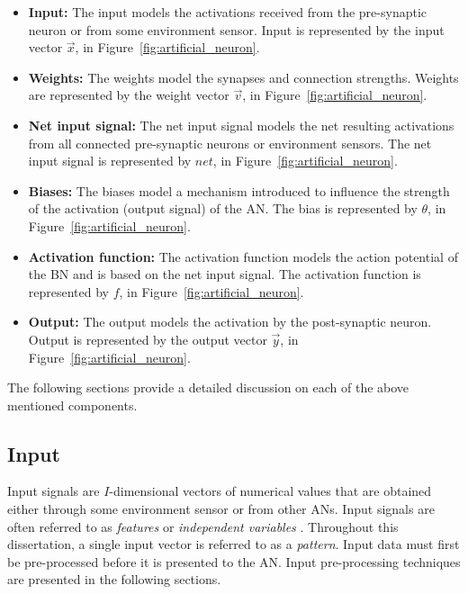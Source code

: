 \begin{itemize}
    \item \textbf{Input:} The input models the activations received from the pre-synaptic neuron or from some environment sensor. Input is represented by the input vector $\vec{x}$, in Figure~\ref{fig:artificial_neuron}.

    \item \textbf{Weights:} The weights model the synapses and connection strengths. Weights are represented by the weight vector $\vec{v}$, in Figure~\ref{fig:artificial_neuron}.

    \item {}\textbf{Net input signal:} The net input signal models the net resulting activations from all connected pre-synaptic neurons or environment sensors. The net input signal is represented by $net$, in Figure~\ref{fig:artificial_neuron}.

    \item \textbf{Biases:} The biases model a mechanism introduced to influence the strength of the activation (output signal) of the \acs{AN}. The bias is represented by $\theta$, in Figure~\ref{fig:artificial_neuron}.

    \item {}\textbf{Activation function:} The activation function models the action potential of the \acs{BN} and is based on the net input signal. The activation function is represented by $f$, in Figure~\ref{fig:artificial_neuron}.

    \item \textbf{Output:} The output models the activation by the post-synaptic neuron. Output is represented by the output vector $\vec{y}$, in Figure~\ref{fig:artificial_neuron}.
\end{itemize}

\noindent
The following sections provide a detailed discussion on each of the above mentioned components.


\subsection{Input}\label{sec:anns:an:input}

Input signals are $I$-dimensional vectors of numerical values that are obtained either through some environment sensor or from other \acp{AN}. Input signals are often referred to as \textit{features} or \textit{independent variables} \cite{ref:francis:2001}. Throughout this dissertation, a single input vector is referred to as a \textit{pattern}. Input data must first be pre-processed before it is presented to the \acs{AN}. Input pre-processing techniques are presented in the following sections.


